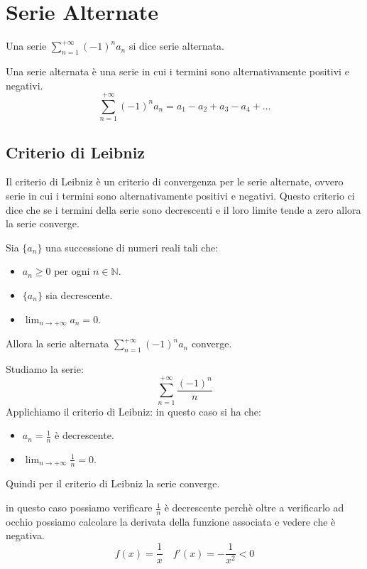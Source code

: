 \section{Serie Alternate}
    \begin{definizione}
        Una serie $\sum_{n=1}^{+\infty} (-1)^n a_n$ si dice serie alternata.
    \end{definizione}
        \begin{approfondimento}
            Una serie alternata è una serie in cui i termini sono alternativamente positivi e negativi.
                \begin{equation}
                    \sum_{n=1}^{+\infty} (-1)^n a_n = a_1 - a_2 + a_3 - a_4 + \ldots
                \end{equation}
        \end{approfondimento}
    \subsection{Criterio di Leibniz}
    Il criterio di Leibniz è un criterio di convergenza per le serie alternate, ovvero serie in cui i termini sono alternativamente positivi e negativi. Questo criterio ci dice che se i termini della serie sono decrescenti e il loro limite tende a zero allora la serie converge.
        \begin{definizione}
            Sia $\{a_n\}$ una successione di numeri reali tali che:
            \begin{itemize}
                \item $a_n \geq 0$ per ogni $n \in \mathbb{N}$.
                \item $\{a_n\}$ sia decrescente.
                \item $\lim_{n \to +\infty} a_n = 0$.
            \end{itemize}
            Allora la serie alternata $\sum_{n=1}^{+\infty} (-1)^n a_n$ converge.
        \end{definizione}
        \begin{esempio}
            Studiamo la serie:
                \[ \sum_{n=1}^{+\infty} \frac{(-1)^n}{n} \]
            Applichiamo il criterio di Leibniz:
            in questo caso si ha che:
            \begin{itemize}
                \item $a_n = \frac{1}{n}$ è decrescente.
                \item $\lim_{n \to +\infty} \frac{1}{n} = 0$.
            \end{itemize}
            Quindi per il criterio di Leibniz la serie converge.
                \begin{approfondimento}
                    in questo caso possiamo verificare $\frac{1}{n}$ è decrescente perchè oltre a verificarlo ad occhio possiamo calcolare la derivata della funzione associata e vedere che è negativa.
                        \begin{equation}
                            f(x) = \frac{1}{x} \quad f'(x) = -\frac{1}{x^2} < 0
                        \end{equation}
                \end{approfondimento}
        \end{esempio}
